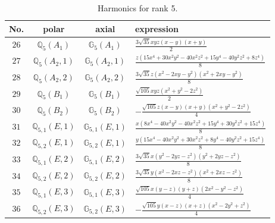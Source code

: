 \documentclass[fleqn,8pt,landscape]{jsarticle}
\begin{document}
\begin{table}[ht!]
\begin{center}
\caption{Harmonics for rank 5.}
\renewcommand{\arraystretch}{1.3}
\begin{tabular}{cccl} \hline \hline
No. & polar & axial & expression \\ \hline
$ 26 $ & $ \mathbb{Q}_{5}(A_{1}) $ & $ \mathbb{G}_{5}(A_{1}) $ & $ \frac{3 \sqrt{35} x y z \left(x - y\right) \left(x + y\right)}{2} $ \\
$ 27 $ & $ \mathbb{Q}_{5}(A_{2},1) $ & $ \mathbb{G}_{5}(A_{2},1) $ & $ \frac{z \left(15 x^{4} + 30 x^{2} y^{2} - 40 x^{2} z^{2} + 15 y^{4} - 40 y^{2} z^{2} + 8 z^{4}\right)}{8} $ \\
$ 28 $ & $ \mathbb{Q}_{5}(A_{2},2) $ & $ \mathbb{G}_{5}(A_{2},2) $ & $ \frac{3 \sqrt{35} z \left(x^{2} - 2 x y - y^{2}\right) \left(x^{2} + 2 x y - y^{2}\right)}{8} $ \\
$ 29 $ & $ \mathbb{Q}_{5}(B_{1}) $ & $ \mathbb{G}_{5}(B_{1}) $ & $ \frac{\sqrt{105} x y z \left(x^{2} + y^{2} - 2 z^{2}\right)}{2} $ \\
$ 30 $ & $ \mathbb{Q}_{5}(B_{2}) $ & $ \mathbb{G}_{5}(B_{2}) $ & $ - \frac{\sqrt{105} z \left(x - y\right) \left(x + y\right) \left(x^{2} + y^{2} - 2 z^{2}\right)}{4} $ \\
$ 31 $ & $ \mathbb{Q}_{5,1}(E,1) $ & $ \mathbb{G}_{5,1}(E,1) $ & $ \frac{x \left(8 x^{4} - 40 x^{2} y^{2} - 40 x^{2} z^{2} + 15 y^{4} + 30 y^{2} z^{2} + 15 z^{4}\right)}{8} $ \\
$ 32 $ & $ \mathbb{Q}_{5,2}(E,1) $ & $ \mathbb{G}_{5,2}(E,1) $ & $ \frac{y \left(15 x^{4} - 40 x^{2} y^{2} + 30 x^{2} z^{2} + 8 y^{4} - 40 y^{2} z^{2} + 15 z^{4}\right)}{8} $ \\
$ 33 $ & $ \mathbb{Q}_{5,1}(E,2) $ & $ \mathbb{G}_{5,1}(E,2) $ & $ \frac{3 \sqrt{35} x \left(y^{2} - 2 y z - z^{2}\right) \left(y^{2} + 2 y z - z^{2}\right)}{8} $ \\
$ 34 $ & $ \mathbb{Q}_{5,2}(E,2) $ & $ \mathbb{G}_{5,2}(E,2) $ & $ \frac{3 \sqrt{35} y \left(x^{2} - 2 x z - z^{2}\right) \left(x^{2} + 2 x z - z^{2}\right)}{8} $ \\
$ 35 $ & $ \mathbb{Q}_{5,1}(E,3) $ & $ \mathbb{G}_{5,1}(E,3) $ & $ \frac{\sqrt{105} x \left(y - z\right) \left(y + z\right) \left(2 x^{2} - y^{2} - z^{2}\right)}{4} $ \\
$ 36 $ & $ \mathbb{Q}_{5,2}(E,3) $ & $ \mathbb{G}_{5,2}(E,3) $ & $ - \frac{\sqrt{105} y \left(x - z\right) \left(x + z\right) \left(x^{2} - 2 y^{2} + z^{2}\right)}{4} $ \\
 \hline \hline
\end{tabular}
\end{center}
\end{table}
\end{document}
